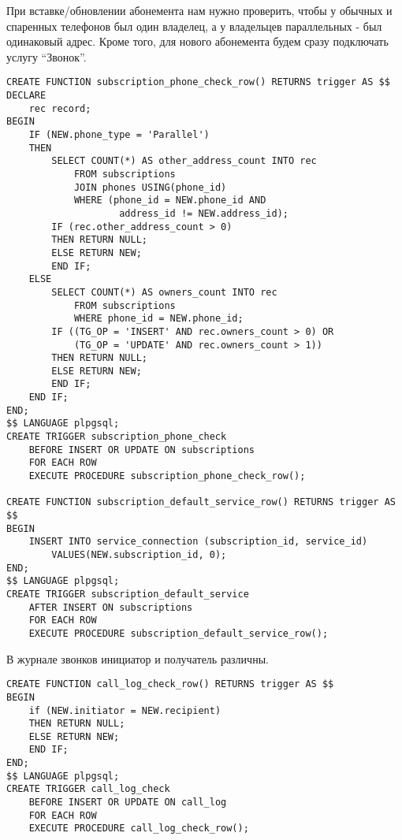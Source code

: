 \documentclass{report}
\begin{document}
При вставке/обновлении абонемента нам нужно проверить, чтобы у
обычных и спаренных телефонов был один владелец, а у владельцев
параллельных - был одинаковый адрес. Кроме того, для нового абонемента
будем сразу подключать услугу ``Звонок''.

\begin{lstlisting}
CREATE FUNCTION subscription_phone_check_row() RETURNS trigger AS $$
DECLARE
    rec record;
BEGIN
    IF (NEW.phone_type = 'Parallel')
    THEN
        SELECT COUNT(*) AS other_address_count INTO rec 
            FROM subscriptions 
            JOIN phones USING(phone_id)
            WHERE (phone_id = NEW.phone_id AND 
                    address_id != NEW.address_id);
        IF (rec.other_address_count > 0)
        THEN RETURN NULL;
        ELSE RETURN NEW;
        END IF;
    ELSE
        SELECT COUNT(*) AS owners_count INTO rec 
            FROM subscriptions 
            WHERE phone_id = NEW.phone_id;
        IF ((TG_OP = 'INSERT' AND rec.owners_count > 0) OR 
            (TG_OP = 'UPDATE' AND rec.owners_count > 1))
        THEN RETURN NULL;
        ELSE RETURN NEW;
        END IF;
    END IF;
END;
$$ LANGUAGE plpgsql;
CREATE TRIGGER subscription_phone_check 
    BEFORE INSERT OR UPDATE ON subscriptions
    FOR EACH ROW 
    EXECUTE PROCEDURE subscription_phone_check_row();

CREATE FUNCTION subscription_default_service_row() RETURNS trigger AS $$
BEGIN
    INSERT INTO service_connection (subscription_id, service_id)
        VALUES(NEW.subscription_id, 0);
END;
$$ LANGUAGE plpgsql;
CREATE TRIGGER subscription_default_service
    AFTER INSERT ON subscriptions
    FOR EACH ROW 
    EXECUTE PROCEDURE subscription_default_service_row();
\end{lstlisting}

В журнале звонков инициатор и получатель различны.

\begin{lstlisting}
CREATE FUNCTION call_log_check_row() RETURNS trigger AS $$
BEGIN
    if (NEW.initiator = NEW.recipient)
    THEN RETURN NULL;
    ELSE RETURN NEW;
    END IF;
END;
$$ LANGUAGE plpgsql;
CREATE TRIGGER call_log_check 
    BEFORE INSERT OR UPDATE ON call_log
    FOR EACH ROW 
    EXECUTE PROCEDURE call_log_check_row();
\end{lstlisting}
\end{document}
